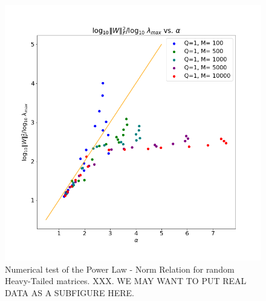 \begin{figure}[!htb]
 \centering
   \includegraphics[scale=0.40]{img/Alpha-LogNorm-Relations.png}
   \caption{
Numerical test of the  Power Law - Norm Relation for random Heavy-Tailed matrices.
XXX.  WE MAY WANT TO PUT REAL DATA AS A SUBFIGURE HERE.
}
  \label{fig:randW}
\end{figure}

